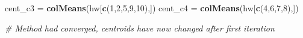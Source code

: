 \documentclass[
]{article}
\newenvironment{Shaded}{\begin{snugshade}}{\end{snugshade}}
\newcommand{\CommentTok}[1]{\textcolor[rgb]{0.56,0.35,0.01}{\textit{#1}}}
\newcommand{\DecValTok}[1]{\textcolor[rgb]{0.00,0.00,0.81}{#1}}
\newcommand{\KeywordTok}[1]{\textcolor[rgb]{0.13,0.29,0.53}{\textbf{#1}}}
\newcommand{\NormalTok}[1]{#1}
\newcommand{\StringTok}[1]{\textcolor[rgb]{0.31,0.60,0.02}{#1}}
\begin{document}
\begin{Shaded}
\begin{Highlighting}[]
\NormalTok{cent_c3 =}\StringTok{ }\KeywordTok{colMeans}\NormalTok{(hw[}\KeywordTok{c}\NormalTok{(}\DecValTok{1}\NormalTok{,}\DecValTok{2}\NormalTok{,}\DecValTok{5}\NormalTok{,}\DecValTok{9}\NormalTok{,}\DecValTok{10}\NormalTok{),])}
\NormalTok{cent_c4 =}\StringTok{ }\KeywordTok{colMeans}\NormalTok{(hw[}\KeywordTok{c}\NormalTok{(}\DecValTok{4}\NormalTok{,}\DecValTok{6}\NormalTok{,}\DecValTok{7}\NormalTok{,}\DecValTok{8}\NormalTok{),])}

\CommentTok{# Method had converged, centroids have now changed after first iteration}
\end{Highlighting}
\end{Shaded}
\end{document}
